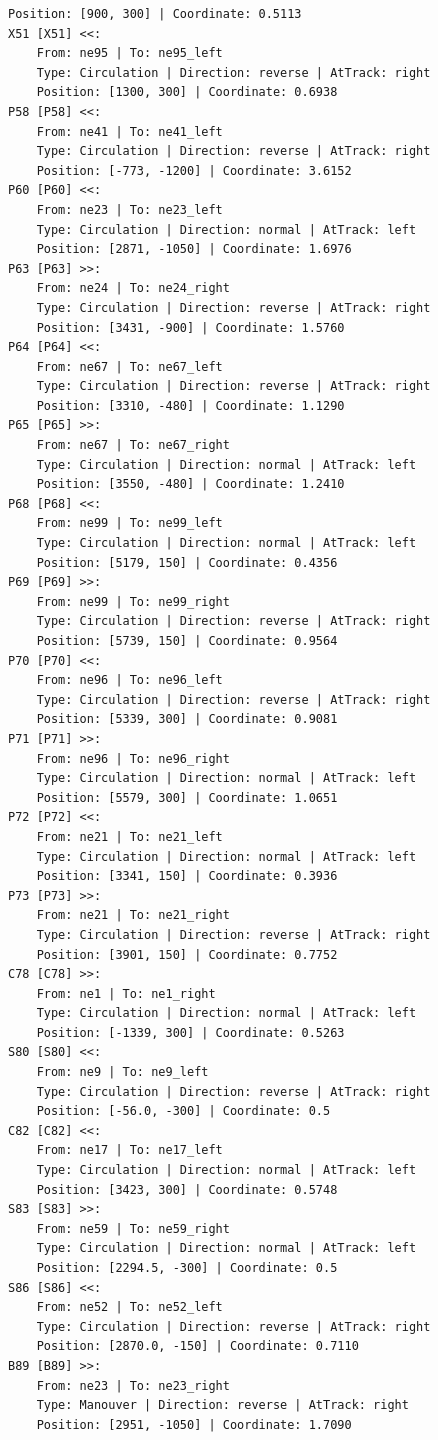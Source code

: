 \begin{lstlisting}[language = {}, tabsize=4, basicstyle=\footnotesize\ttfamily, showspaces=false, showstringspaces=false, caption = Signalling.RNA, label = {lst:EJ3_6}]
	Position: [900, 300] | Coordinate: 0.5113
X51 [X51] <<:
	From: ne95 | To: ne95_left
	Type: Circulation | Direction: reverse | AtTrack: right 
	Position: [1300, 300] | Coordinate: 0.6938
P58 [P58] <<:
	From: ne41 | To: ne41_left
	Type: Circulation | Direction: reverse | AtTrack: right 
	Position: [-773, -1200] | Coordinate: 3.6152
P60 [P60] <<:
	From: ne23 | To: ne23_left
	Type: Circulation | Direction: normal | AtTrack: left 
	Position: [2871, -1050] | Coordinate: 1.6976
P63 [P63] >>:
	From: ne24 | To: ne24_right
	Type: Circulation | Direction: reverse | AtTrack: right 
	Position: [3431, -900] | Coordinate: 1.5760
P64 [P64] <<:
	From: ne67 | To: ne67_left
	Type: Circulation | Direction: reverse | AtTrack: right 
	Position: [3310, -480] | Coordinate: 1.1290
P65 [P65] >>:
	From: ne67 | To: ne67_right
	Type: Circulation | Direction: normal | AtTrack: left 
	Position: [3550, -480] | Coordinate: 1.2410
P68 [P68] <<:
	From: ne99 | To: ne99_left
	Type: Circulation | Direction: normal | AtTrack: left 
	Position: [5179, 150] | Coordinate: 0.4356
P69 [P69] >>:
	From: ne99 | To: ne99_right
	Type: Circulation | Direction: reverse | AtTrack: right 
	Position: [5739, 150] | Coordinate: 0.9564
P70 [P70] <<:
	From: ne96 | To: ne96_left
	Type: Circulation | Direction: reverse | AtTrack: right 
	Position: [5339, 300] | Coordinate: 0.9081
P71 [P71] >>:
	From: ne96 | To: ne96_right
	Type: Circulation | Direction: normal | AtTrack: left 
	Position: [5579, 300] | Coordinate: 1.0651
P72 [P72] <<:
	From: ne21 | To: ne21_left
	Type: Circulation | Direction: normal | AtTrack: left 
	Position: [3341, 150] | Coordinate: 0.3936
P73 [P73] >>:
	From: ne21 | To: ne21_right
	Type: Circulation | Direction: reverse | AtTrack: right 
	Position: [3901, 150] | Coordinate: 0.7752
C78 [C78] >>:
	From: ne1 | To: ne1_right
	Type: Circulation | Direction: normal | AtTrack: left 
	Position: [-1339, 300] | Coordinate: 0.5263
S80 [S80] <<:
	From: ne9 | To: ne9_left
	Type: Circulation | Direction: reverse | AtTrack: right 
	Position: [-56.0, -300] | Coordinate: 0.5
C82 [C82] <<:
	From: ne17 | To: ne17_left
	Type: Circulation | Direction: normal | AtTrack: left 
	Position: [3423, 300] | Coordinate: 0.5748
S83 [S83] >>:
	From: ne59 | To: ne59_right
	Type: Circulation | Direction: normal | AtTrack: left 
	Position: [2294.5, -300] | Coordinate: 0.5
S86 [S86] <<:
	From: ne52 | To: ne52_left
	Type: Circulation | Direction: reverse | AtTrack: right 
	Position: [2870.0, -150] | Coordinate: 0.7110
B89 [B89] >>:
	From: ne23 | To: ne23_right
	Type: Manouver | Direction: reverse | AtTrack: right 
	Position: [2951, -1050] | Coordinate: 1.7090

\end{lstlisting}
